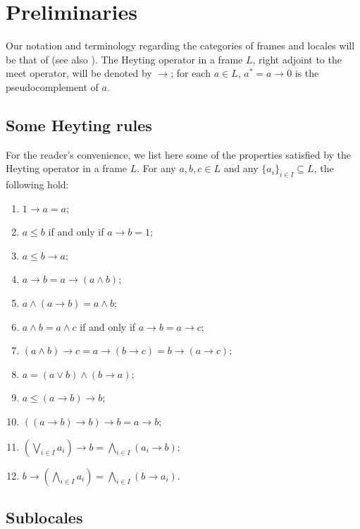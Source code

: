 \documentclass[11pt,a4paper,reqno]{amsart}
\newcommand{\tbigwedge}{\mathop{\textstyle \bigwedge }}%
\newcommand{\tbigvee}{\mathop{\textstyle \bigvee }}%
\theoremstyle{definition}
\theoremstyle{remark}
\begin{document}
\section{Preliminaries}\label{sec.prel}
Our notation and terminology regarding the categories of frames and locales will be that of \cite{PP12} (see also \cite{STONE}). The Heyting operator in a frame $L$, right adjoint to the meet operator, will be denoted by $\to$; for each $a\in L$, $a^*=a\to 0$ is the pseudocomplement of $a$. 

\subsection{Some Heyting rules}
For the reader's convenience, we list here some of the properties satisfied by the Heyting operator in a frame $L$. For any $a,b,c\in L$ and any $\{a_i\}_{i\in I}\subseteq L$, the following hold:
\begin{enumerate}[label=\textup{(H\arabic*)},leftmargin=2.0\parindent]
\item \label{H1} $1\to a=a$\textup;
\item \label{H2} $a\leq b$ if and only if $a\to b=1$\textup;
\item \label{H3} $a\leq b\to a$\textup;
\item \label{H4} $a\to b=a\to (a\wedge b)$\textup;
\item \label{H5} $a\wedge (a\to b)=a\wedge b$\textup;
\item \label{H6} $a\wedge b=a\wedge c$ if and only if $a\to b=a\to c$\textup;
\item \label{H7} $(a\wedge b)\to c=a\to (b\to c)= b\to (a\to c)$\textup;
\item \label{H8} $a=(a\vee b)\wedge (b\to a)$\textup;
\item \label{H9} $a\leq (a\to b)\to b$\textup;
\item \label{H10} $((a\to b)\to b)\to b=a\to b$\textup;
\item \label{H11}$(\tbigvee_{i\in I}a_i)\to b= \tbigwedge_{i\in I}(a_i\to b)$\textup;
\item \label{H12}$b\to (\tbigwedge_{i\in I}a_i)= \tbigwedge_{i\in I}(b\to a_i)$\textup.
\end{enumerate}


\subsection{Sublocales}\label{subsect.sublocales}
\end{document}

